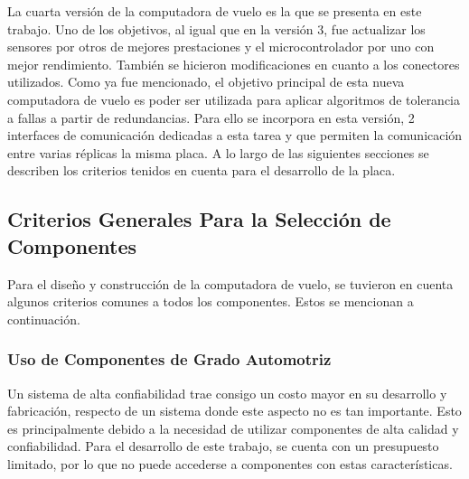 La cuarta versión de la computadora de vuelo es la que se presenta en este trabajo. Uno de los objetivos, al igual que en la versión 3, fue actualizar los sensores por otros de mejores prestaciones y el microcontrolador por uno con mejor rendimiento. También se hicieron modificaciones en cuanto a los conectores utilizados. Como ya fue mencionado, el objetivo principal de esta nueva computadora de vuelo es poder ser utilizada para aplicar algoritmos de tolerancia a fallas a partir de redundancias. Para ello se incorpora en esta versión, 2 interfaces de comunicación dedicadas a esta tarea y que permiten la comunicación entre varias réplicas la misma placa. A lo largo de las siguientes secciones se describen los criterios tenidos en cuenta para el desarrollo de la placa.

\subsection{Criterios Generales Para la Selección de Componentes}


Para el diseño y construcción de la computadora de vuelo, se tuvieron en cuenta algunos criterios comunes a todos los componentes. Estos se mencionan a continuación.


\subsubsection{Uso de Componentes de Grado Automotriz}

Un sistema de alta confiabilidad trae consigo un costo mayor en su desarrollo y fabricación, respecto de un sistema donde este aspecto no es tan importante. Esto es principalmente debido a la necesidad de utilizar componentes de alta calidad y confiabilidad. Para el desarrollo de este trabajo, se cuenta con un presupuesto limitado, por lo que no puede accederse a componentes con estas características.

